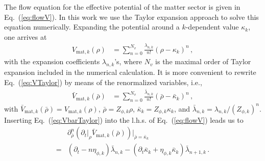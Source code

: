\documentclass[%
reprint,
superscriptaddress,
showpacs,preprintnumbers,
 amsmath,amssymb,
 aps,
prd,
]{revtex4-1}
\def\Eq#1{Eq.~(\ref{#1})}
\begin{document}
The flow equation for the effective potential of the matter sector is given in \Eq{eq:flowV}. In this work we use the Taylor expansion approach to solve this equation numerically. Expanding the potential around a $k$-dependent value $\kappa_k$, one arrives at 
%
\begin{align}
  V_{\mathrm{mat}, k}(\rho)&=\sum_{n=0}^{N_v}\frac{\lambda_{n,k}}{n!}(\rho-\kappa_k)^n\,, \label{eq:VTaylor}
\end{align}
%
with the expansion coefficients $\lambda_{n,k}$'s, where $N_v$ is the maximal order of Taylor expansion included in the numerical calculation. It is more convenient to rewrite \Eq{eq:VTaylor} by means of the renormalized variables, i.e.,
%
\begin{align}
  \bar V_{\mathrm{mat}, k}(\bar \rho)&=\sum_{n=0}^{N_v}\frac{\bar\lambda_{n,k}}{n!}(\bar \rho-\bar \kappa_k)^n\,,\label{eq:VbarTaylor}
\end{align}
%
with $\bar V_{\mathrm{mat}, k}(\bar \rho)=V_{\mathrm{mat}, k}(\rho)$, $\bar \rho=Z_{\phi,k} \rho$, $\bar \kappa_k=Z_{\phi,k}\kappa_k$, and $\bar \lambda_{n,k}=\lambda_{n,k}/(Z_{\phi,k})^n$. Inserting \Eq{eq:VbarTaylor} into the l.h.s. of \Eq{eq:flowV} leads us to
%
\begin{align}
  &\partial^n_{\bar \rho}\left(\partial_t\big|_{\rho} \bar V_{\mathrm{mat}, k}(\bar \rho)\right)\Big|_{\bar \rho=\bar \kappa_k}\nonumber\\[2ex]
=&(\partial_t -n\eta_{\phi,k})\bar{\lambda}_{n,k}-(\partial_t \bar \kappa_k+\eta_{\phi,k}\bar \kappa_k)\bar \lambda_{n+1,k}\,.\label{eq:drhoV}
\end{align}
%
\end{document}
